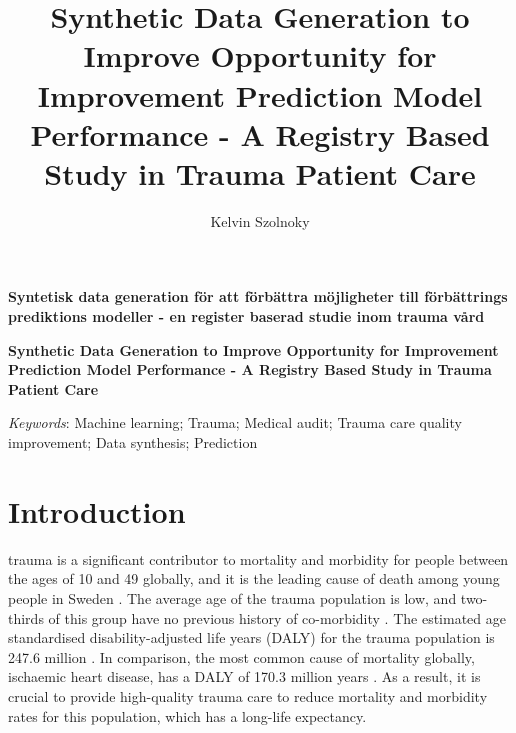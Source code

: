 \documentclass[12pt, a4paper]{article}
\author{Kelvin Szolnoky}
\title{Synthetic Data Generation to Improve Opportunity for Improvement Prediction Model Performance - A Registry Based Study in Trauma Patient Care}
\begin{document}

\begin{titlepage}
    
\end{titlepage}
\fontsize{11}{13}\selectfont


\textbf{Syntetisk data generation för att förbättra möjligheter till förbättrings prediktions modeller - en register baserad studie inom trauma vård}

\vfill

\textbf{Synthetic Data Generation to Improve Opportunity for Improvement Prediction Model Performance - A Registry Based Study in Trauma Patient Care}

\vfill

\textit{Keywords}: Machine learning; Trauma; Medical audit; Trauma care quality improvement; Data synthesis; Prediction

\newpage

\normalsize

\glsaddall
\printnoidxglossary[type=acronym,style=csuper]
\printnoidxglossary[style=gsuper]

\newpage
{}


\section{Introduction}
\Gls{trauma} is a significant contributor to mortality and morbidity for people between the ages of 10 and 49 globally, and it is the leading cause of death among young people in Sweden \cite{roth_global_2018, vos_global_2020, sos_death_2021}. The average age of the trauma population is low, and two-thirds of this group have no previous history of co-morbidity \cite{brattstrom_socio-economic_2015}. The estimated age standardised disability-adjusted life years (DALY) for the trauma population is 247.6 million \cite{haagsma_global_2016}. In comparison, the most common cause of mortality globally, ischaemic heart disease, has a DALY of 170.3 million years \cite{wang_global_2021,roth_global_2018}. As a result, it is crucial to provide high-quality trauma care to reduce mortality and morbidity rates for this population, which has a long-life expectancy.
\end{document}

